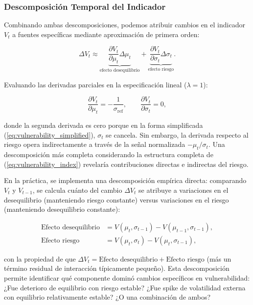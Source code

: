 \documentclass[3p,11pt,draft,natbib=false]{elsarticle}
\begin{document}
\subsubsection{Descomposición Temporal del Indicador}

Combinando ambas descomposiciones, podemos atribuir cambios en el indicador $V_t$ a fuentes específicas mediante aproximación de primera orden:

\begin{equation}
\Delta V_t \approx \underbrace{\frac{\partial V_t}{\partial \mu_t} \Delta \mu_t}_{\text{efecto desequilibrio}} + \underbrace{\frac{\partial V_t}{\partial \sigma_t} \Delta \sigma_t}_{\text{efecto riesgo}}.
\label{eq:vulnerability_change}
\end{equation}

Evaluando las derivadas parciales en la especificación lineal ($\lambda = 1$):

\begin{equation}
\frac{\partial V_t}{\partial \mu_t} = -\frac{1}{\sigma_{\text{ref}}}, \qquad \frac{\partial V_t}{\partial \sigma_t} = 0,
\label{eq:vulnerability_derivatives}
\end{equation}

donde la segunda derivada es cero porque en la forma simplificada (\ref{eq:vulnerability_simplified}), $\sigma_t$ se cancela. Sin embargo, la derivada respecto al riesgo opera indirectamente a través de la señal normalizada $-\mu_t/\sigma_t$. Una descomposición más completa considerando la estructura completa de (\ref{eq:vulnerability_index}) revelaría contribuciones directas e indirectas del riesgo.

En la práctica, se implementa una descomposición empírica directa: comparando $V_t$ y $V_{t-1}$, se calcula cuánto del cambio $\Delta V_t$ se atribuye a variaciones en el desequilibrio (manteniendo riesgo constante) versus variaciones en el riesgo (manteniendo desequilibrio constante):

\begin{align}
\text{Efecto desequilibrio} &= V(\mu_t, \sigma_{t-1}) - V(\mu_{t-1}, \sigma_{t-1}), \label{eq:effect_disequilibrium} \\
\text{Efecto riesgo} &= V(\mu_t, \sigma_t) - V(\mu_t, \sigma_{t-1}), \label{eq:effect_risk}
\end{align}

con la propiedad de que $\Delta V_t = \text{Efecto desequilibrio} + \text{Efecto riesgo}$ (más un término residual de interacción típicamente pequeño). Esta descomposición permite identificar qué componente dominó cambios específicos en vulnerabilidad: ¿Fue deterioro de equilibrio con riesgo estable? ¿Fue spike de volatilidad externa con equilibrio relativamente estable? ¿O una combinación de ambos?
\end{document}
